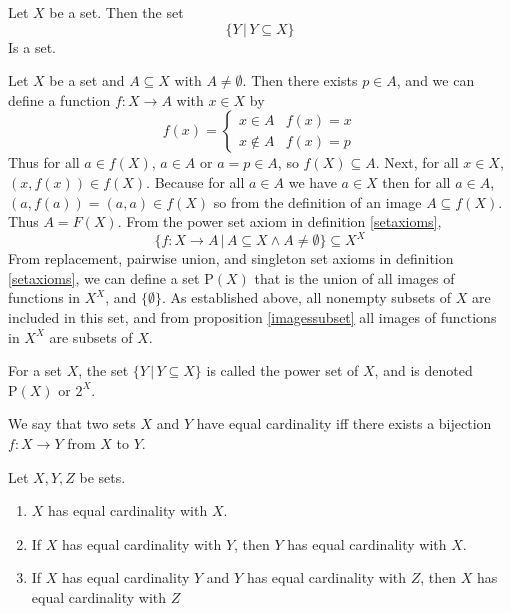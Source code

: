 \documentclass{article}
\begin{document}
\begin{lemma}
	Let \(X\) be a set. Then the set
	\begin{equation*}
		\{Y\,|\,Y\subseteq X\}
	\end{equation*}
	Is a set.
	\begin{IEEEproof}
		Let \(X\) be a set and \(A\subseteq X\) with \(A\neq\emptyset\). Then there exists \(p\in A\), and we can define a function \(f:X\rightarrow A\) with \(x\in X\) by
		\begin{equation*}
			f(x)=\begin{cases}
				x\in A&f(x)=x\\
				x\notin A&f(x)=p
			\end{cases}
		\end{equation*}
		Thus for all \(a\in f(X)\), \(a\in A\) or \(a=p\in A\), so \(f(X)\subseteq A\). Next, for all \(x\in X\), \((x,f(x))\in f(X)\). Because for all \(a\in A\) we have \(a\in X\) then for all \(a\in A\), \((a,f(a))=(a,a)\in f(X)\) so from the definition of an image \(A\subseteq f(X)\). Thus \(A=F(X)\). From the power set axiom in definition \ref{setaxioms}, 
		\begin{equation*}
			\{f:X\rightarrow A\,|\,A\subseteq X\wedge A\neq\emptyset\}\subseteq X^X
		\end{equation*}
		From replacement, pairwise union, and singleton set axioms in definition \ref{setaxioms}, we can define a set \(\text{P}(X)\) that is the union of all images of functions in \(X^X\), and \(\{\emptyset\}\). As established above, all nonempty subsets of \(X\) are included in this set, and from proposition \ref{imagessubset} all images of functions in \(X^X\) are subsets of \(X\).
	\end{IEEEproof}
\end{lemma}
\begin{definition}
	For a set \(X\), the set \(\{Y\,|\,Y\subseteq X\}\) is called the power set of \(X\), and is denoted \(\text{P}(X)\) or \(2^X\).
\end{definition}
\begin{definition}[Cardinality]
	We say that two sets \(X\) and \(Y\) have equal cardinality iff there exists a bijection \(f:X\rightarrow Y\) from \(X\) to \(Y\).
\end{definition}
\begin{proposition}
	Let \(X,Y,Z\) be sets.
	\begin{enumerate}
		\item \(X\) has equal cardinality with \(X\).
		\item If \(X\) has equal cardinality with \(Y\), then \(Y\) has equal cardinality with \(X\).
		\item If \(X\) has equal cardinality \(Y\) and \(Y\) has equal cardinality with \(Z\), then \(X\) has equal cardinality with \(Z\)
			\begin{IEEEproof}
			\end{IEEEproof}
	\end{enumerate}
\end{proposition}
\end{document}
